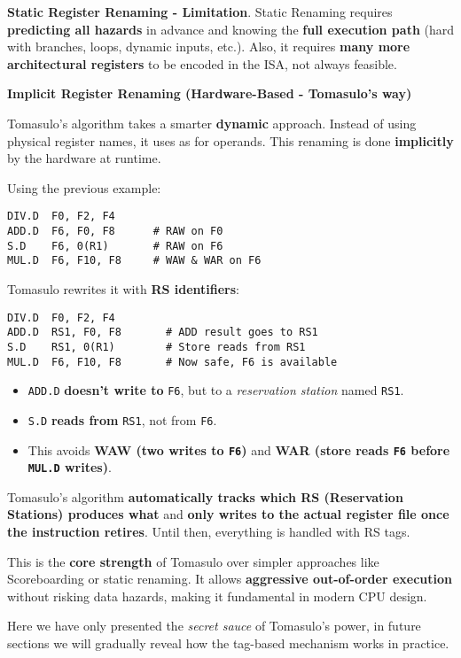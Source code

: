 \highspace
\textcolor{Red2}{ \textbf{Static Register Renaming - Limitation}}. Static Renaming requires \textbf{predicting all hazards} in advance and knowing the \textbf{full execution path} (hard with branches, loops, dynamic inputs, etc.). Also, it requires \textbf{many more architectural registers} to be encoded in the ISA, not always feasible.

\newpage

\begin{flushleft}
    \textcolor{Green3}{ \textbf{Implicit Register Renaming (Hardware-Based - Tomasulo's way)}}
\end{flushleft}
Tomasulo's algorithm takes a smarter \textbf{dynamic} approach. Instead of using physical register names, it uses  as  for operands. This renaming is done \textbf{implicitly} by the hardware at runtime.

\highspace
Using the previous example:
\begin{lstlisting}[language=unknown]
DIV.D  F0, F2, F4
ADD.D  F6, F0, F8      # RAW on F0
S.D    F6, 0(R1)       # RAW on F6
MUL.D  F6, F10, F8     # WAW & WAR on F6
\end{lstlisting}
Tomasulo rewrites it with \textbf{RS identifiers}:
\begin{lstlisting}[language=unknown]
DIV.D  F0, F2, F4
ADD.D  RS1, F0, F8       # ADD result goes to RS1
S.D    RS1, 0(R1)        # Store reads from RS1
MUL.D  F6, F10, F8       # Now safe, F6 is available
\end{lstlisting}
\begin{itemize}
    \item \texttt{ADD.D} \textbf{doesn't write to} \texttt{F6}, but to a \emph{reservation station} named \texttt{RS1}.
    \item \texttt{S.D} \textbf{reads from} \texttt{RS1}, not from \texttt{F6}.
    \item This avoids \textbf{WAW (two writes to \texttt{F6})} and \textbf{WAR (store reads \texttt{F6} before \texttt{MUL.D} writes)}.
\end{itemize}
Tomasulo's algorithm \textbf{automatically tracks which RS (Reservation Stations) produces what} and \textbf{only writes to the actual register file once the instruction retires}. Until then, everything is handled with RS tags.

\highspace
This is the \textbf{core strength} of Tomasulo over simpler approaches like Scoreboarding or static renaming. It allows \textbf{aggressive out-of-order execution} without risking data hazards, making it fundamental in modern CPU design.

\highspace
Here we have only presented the \emph{secret sauce} of Tomasulo's power, in future sections we will gradually reveal how the tag-based mechanism works in practice.